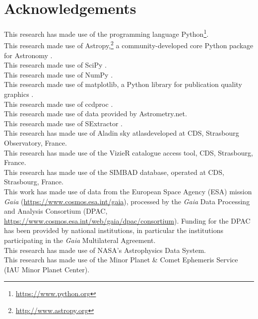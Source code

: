 \documentclass{article}
\begin{document}

\pagebreak
\section{Acknowledgements}

This research has made use of the programming language Python\footnote{\url{https://www.python.org}}.\\ %
This research made use of Astropy,\footnote{\url{http://www.astropy.org}} a community-developed core Python package for Astronomy \parencite{Astropy1,Astropy2}. \\
This research made use of SciPy \parencite{jones_scipy_2001}.\\
This research made use of NumPy \parencite{van2011numpy}.\\
This research made use of matplotlib, a Python library for publication quality graphics \parencite{Hunter:2007}.\\
This research made use of ccdproc \parencite{2015ascl.soft10007C}.\\
This research made use of data provided by Astrometry.net. \parencite{Astrometry}\\
This research made use of SExtractor \parencite{SExtractor}. \\
This research has made use of \ldq Aladin sky atlas\rdq developed at CDS, Strasbourg Observatory, France.\\ 
This research has made use of the VizieR catalogue access tool, CDS, Strasbourg, France.\\
This research has made use of the SIMBAD database, operated at CDS, Strasbourg, France.\\
This work has made use of data from the European Space Agency (ESA) mission
{\it Gaia} (\url{https://www.cosmos.esa.int/gaia}), processed by the {\it Gaia}
Data Processing and Analysis Consortium (DPAC,
\url{https://www.cosmos.esa.int/web/gaia/dpac/consortium}). Funding for the DPAC
has been provided by national institutions, in particular the institutions
participating in the {\it Gaia} Multilateral Agreement.\\
This research has made use of NASA's Astrophysics Data System.\\
This research has made use of the Minor Planet \& Comet Ephemeris Service (IAU Minor Planet Center).\\
\end{document}
